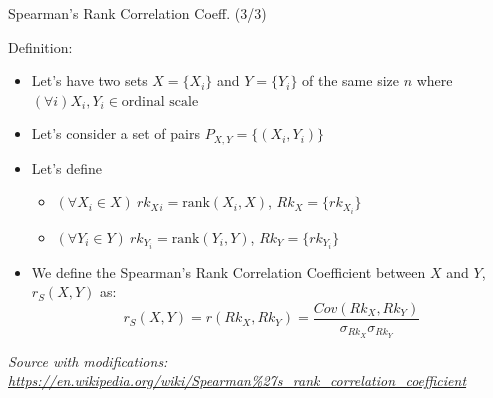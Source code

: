 \documentclass{beamer}
\begin{document}
\begin{frame}
{\centerline{Spearman's Rank Correlation Coeff. (3/3)}}
Definition:
\begin{itemize}
   \item Let's have two sets $X = \{X_i\}$ and $Y= \{Y_i\}$ of the same size $n$ where $(\forall i) X_i,Y_i \in \text{ordinal scale}$
   \item Let's consider a set of pairs $P_{X,Y} = \{(X_i,Y_i)\}$ 
   \item Let's define 
   \begin{itemize}
   \item $(\forall X_i \in X) ~ rk{_X{_i}} = \text{rank}(X_i,X)$, $Rk_X = \{ rk_{X{_i}} \} $ 
   \item $(\forall Y_i \in Y) ~ rk_{Y{_i}} = \text{rank}(Y_i,Y)$, $Rk_Y = \{ rk_{Y{_i}} \} $ 
\end{itemize}
    \item We define the Spearman's Rank Correlation Coefficient between $X$ and $Y$, $r_S(X,Y)$ as:
    $$r_S(X,Y) = r(Rk_X, Rk_Y) = \frac{Cov(Rk_X,Rk_Y)}{\sigma_{Rk_X}\sigma_{Rk_Y}}$$
\end{itemize}

\textit{\tiny
\vspace{-\baselineskip}
Source with modifications: \url{https://en.wikipedia.org/wiki/Spearman\%27s_rank_correlation_coefficient}}

\end{frame}
\end{document}
